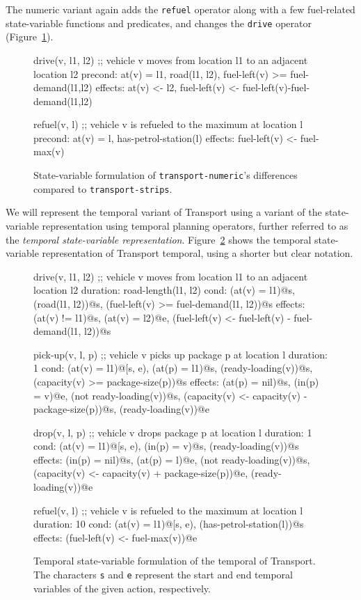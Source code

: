 The numeric variant again adds the \verb+refuel+ operator along with
a few fuel-related state-variable functions and predicates, and changes 
the \verb+drive+ operator (Figure~\ref{code:statevar-numeric}).

\begin{figure}[tb]
\begin{code}
drive(v, l1, l2)
  ;; vehicle v moves from location l1 to an adjacent location l2
  precond: at(v) = l1, road(l1, l2), fuel-left(v) >= fuel-demand(l1,l2)
  effects: at(v) <- l2, fuel-left(v) <- fuel-left(v)-fuel-demand(l1,l2)
  
refuel(v, l)
  ;; vehicle v is refueled to the maximum at location l
  precond: at(v) = l, has-petrol-station(l)
  effects: fuel-left(v) <- fuel-max(v)
\end{code}
\caption{State-variable formulation of \texttt{transport-numeric}'s differences
compared to \texttt{transport-strips}.}
\label{code:statevar-numeric}
\end{figure}

We will represent the temporal variant of Transport using a variant of the state-variable representation using temporal planning operators, further referred to as the \textit{temporal state-variable representation}.
Figure~\ref{code:statevar-temporal} shows the temporal state-variable representation of Transport temporal, using a shorter but clear notation. 

\begin{figure}[tbp]
\begin{code}
drive(v, l1, l2)
  ;; vehicle v moves from location l1 to an adjacent location l2
  duration: road-length(l1, l2)
  cond: (at(v) = l1)@s, (road(l1, l2))@s,
        (fuel-left(v) >= fuel-demand(l1, l2))@s
  effects: (at(v) != l1)@s, (at(v) = l2)@e,
           (fuel-left(v) <- fuel-left(v) - fuel-demand(l1, l2))@s

pick-up(v, l, p)
  ;; vehicle v picks up package p at location l
  duration: 1
  cond: (at(v) = l1)@[s, e), (at(p) = l1)@s, (ready-loading(v))@s,
        (capacity(v) >= package-size(p))@s
  effects: (at(p) = nil)@s, (in(p) = v)@e, (not ready-loading(v))@s,
           (capacity(v) <- capacity(v) - package-size(p))@s,
           (ready-loading(v))@e
  
drop(v, l, p)
  ;; vehicle v drops package p at location l
  duration: 1
  cond: (at(v) = l1)@[s, e), (in(p) = v)@s, (ready-loading(v))@s
  effects: (in(p) = nil)@s, (at(p) = l)@e, (not ready-loading(v))@s,
           (capacity(v) <- capacity(v) + package-size(p))@e,
           (ready-loading(v))@e
  
refuel(v, l)
  ;; vehicle v is refueled to the maximum at location l
  duration: 10
  cond: (at(v) = l1)@[s, e), (has-petrol-station(l))@s
  effects: (fuel-left(v) <- fuel-max(v))@e
\end{code}
\caption{Temporal state-variable formulation of the temporal of Transport. The characters \texttt{s} and \texttt{e} represent the start and end temporal variables of the given action, respectively.}
\label{code:statevar-temporal}
\end{figure}

